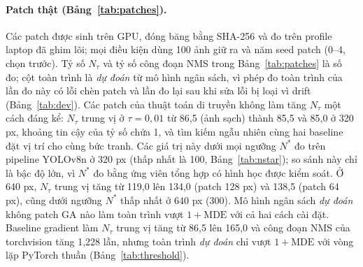 \documentclass[a4paper,fleqn]{cas-dc}
\newcommand{\Ntau}{N_{\tau}}
\begin{document}
\paragraph{Patch thật (Bảng~\ref{tab:patches}).}
Các patch được sinh trên GPU, đóng băng bằng SHA-256 và đo trên profile laptop đã ghim lõi; mọi điều kiện dùng 100 ảnh giữ ra và năm seed patch (0--4, chọn trước). Tỷ số $\Ntau$ và tỷ số công đoạn NMS trong Bảng~\ref{tab:patches} là số đo; cột toàn trình là \emph{dự đoán} từ mô hình ngân sách, vì phép đo toàn trình của lần đo này có lỗi chèn patch và lần đo lại sau khi sửa lỗi bị loại vì drift (Bảng~\ref{tab:dev}). Các patch của thuật toán di truyền không làm tăng $\Ntau$ một cách đáng kể: $\Ntau$ trung vị ở $\tau=0{,}01$ từ 86,5 (ảnh sạch) thành 85,5 và 85,0 ở 320 px, khoảng tin cậy của tỷ số chứa 1, và tìm kiếm ngẫu nhiên cùng hai baseline đặt vị trí cho cùng bức tranh. Các giá trị này dưới mọi ngưỡng $N^{*}$ đo trên pipeline YOLOv8n ở 320 px (thấp nhất là 100, Bảng~\ref{tab:nstar}); so sánh này chỉ là bậc độ lớn, vì $N^{*}$ đo bằng ứng viên tổng hợp có hình học được kiểm soát. Ở 640 px, $\Ntau$ trung vị tăng từ 119,0 lên 134,0 (patch 128 px) và 138,5 (patch 64 px), cũng dưới ngưỡng $N^{*}$ thấp nhất ở 640 px (300). Mô hình ngân sách \emph{dự đoán} không patch GA nào làm toàn trình vượt $1+\mathrm{MDE}$ với cả hai cách cài đặt. Baseline gradient làm $\Ntau$ trung vị tăng từ 86,5 lên 165,0 và công đoạn NMS của torchvision tăng 1,228 lần, nhưng toàn trình \emph{dự đoán} chỉ vượt $1+\mathrm{MDE}$ với vòng lặp PyTorch thuần (Bảng~\ref{tab:threshold}).
\end{document}
